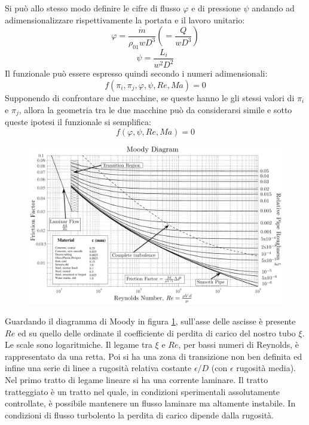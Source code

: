 Si può allo stesso modo definire le cifre di flusso $\varphi$ e di pressione $\psi$ andando ad adimensionalizzare rispettivamente la portata e il lavoro unitario:
\begin{equation}
\varphi = \frac{\dot{m}}{\rho_{01}w D^3} \left( =\frac{Q}{w D^3} \right)
\end{equation}
\begin{equation}\label{eq:psi}
\psi = \frac{L_i}{w^2 D^2}
\end{equation}
Il funzionale può essere espresso quindi secondo i numeri adimensionali:
\begin{equation}
f(\pi_i,\pi_j,\varphi,\psi,Re,Ma)=0
\end{equation}
Supponendo di confrontare due macchine, se queste hanno le gli stessi valori di $\pi_i$ e $\pi_j$, allora la geometria tra le due macchine può da considerarsi simile e sotto queste ipotesi il funzionale si semplifica:
\begin{equation}
f(\varphi,\psi,Re,Ma)=0
\end{equation}
\begin{figure}
\centering
  \includegraphics[width=\textwidth]{fig/moody.jpg}
\caption{}
\label{fig:moody}
\end{figure}
Guardando il diagramma di Moody in figura \ref{fig:moody}, sull'asse delle ascisse è presente $Re$ ed su quello delle ordinate il coefficiente di perdita di carico del nostro tubo $\xi$. Le scale sono logaritmiche. Il legame tra $\xi$ e $Re$, per bassi numeri di Reynolds, è rappresentato da una retta. Poi si ha una zona di transizione non ben definita ed infine una serie di linee a rugosità relativa costante $\epsilon/D$ (con $\epsilon$ rugosità media).\\
Nel primo tratto di legame lineare si ha una corrente laminare. Il tratto tratteggiato è un tratto nel quale, in condizioni sperimentali assolutamente controllate, è possibile mantenere un flusso laminare ma altamente instabile. In condizioni di flusso turbolento la perdita di carico dipende dalla rugosità.\\
